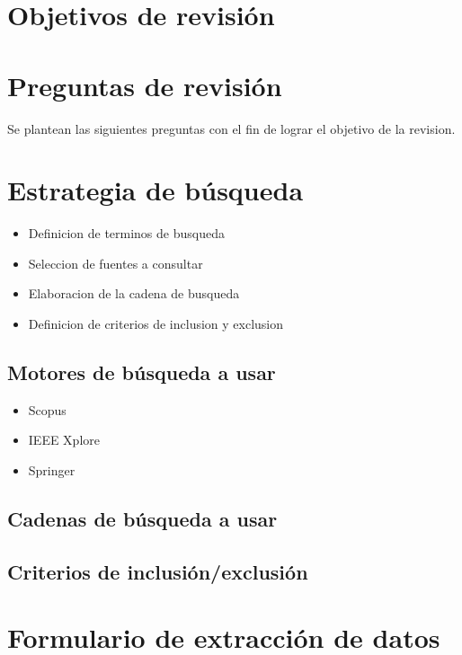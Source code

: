 \documentclass{report}
\begin{document}
\section{Objetivos de revisión}
\section{Preguntas de revisión}

Se plantean las siguientes preguntas con el fin de lograr el objetivo de la
revision.

\section{Estrategia de búsqueda}

\begin{itemize}
    \item{Definicion de terminos de busqueda}
    \item{Seleccion de fuentes a consultar}
    \item{Elaboracion de la cadena de busqueda}
    \item{Definicion de criterios de inclusion y exclusion}
\end{itemize}

\subsection{Motores de búsqueda a usar}

\begin{itemize}
    \item{Scopus}
    \item{IEEE Xplore}
    \item{Springer}
\end{itemize}

\subsection{Cadenas de búsqueda a usar}
\subsection{Criterios de inclusión/exclusión}
\section{Formulario de extracción de datos}
\end{document}
